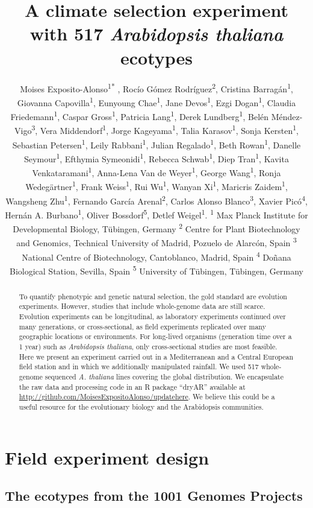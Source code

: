\documentclass[12pt,]{article}
\title{A climate selection experiment with 517 \emph{Arabidopsis thaliana}
ecotypes}
\author{\newline \normalfont Moises
Exposito-Alonso\textsuperscript{1}\textsuperscript{*} , Rocío Gómez
Rodríguez\textsuperscript{2}, Cristina Barragán\textsuperscript{1},
Giovanna Capovilla\textsuperscript{1}, Eunyoung Chae\textsuperscript{1},
Jane Devos\textsuperscript{1}, Ezgi Dogan\textsuperscript{1}, Claudia
Friedemann\textsuperscript{1}, Caspar Gross\textsuperscript{1}, Patricia
Lang\textsuperscript{1}, Derek Lundberg\textsuperscript{1}, Belén
Méndez-Vigo\textsuperscript{3}, Vera Middendorf\textsuperscript{1},
Jorge Kageyama\textsuperscript{1}, Talia Karasov\textsuperscript{1},
Sonja Kersten\textsuperscript{1}, Sebastian Petersen\textsuperscript{1},
Leily Rabbani\textsuperscript{1}, Julian Regalado\textsuperscript{1},
Beth Rowan\textsuperscript{1}, Danelle Seymour\textsuperscript{1},
Efthymia Symeonidi\textsuperscript{1}, Rebecca
Schwab\textsuperscript{1}, Diep Tran\textsuperscript{1}, Kavita
Venkataramani\textsuperscript{1}, Anna-Lena Van de
Weyer\textsuperscript{1}, George Wang\textsuperscript{1}, Ronja
Wedegärtner\textsuperscript{1}, Frank Weiss\textsuperscript{1}, Rui
Wu\textsuperscript{1}, Wanyan Xi\textsuperscript{1}, Maricris
Zaidem\textsuperscript{1}, Wangsheng Zhu\textsuperscript{1}, Fernando
García Arenal\textsuperscript{2}, Carlos Alonso
Blanco\textsuperscript{3}, Xavier Picó\textsuperscript{4}, Hernán A.
Burbano\textsuperscript{1}, Oliver Bossdorf\textsuperscript{5}, Detlef
Weigel\textsuperscript{1}. \newline \small \newline \textsuperscript{1}
Max Planck Institute for Developmental Biology, Tübingen, Germany
\newline \textsuperscript{2} Centre for Plant Biotechnology and
Genomics, Technical University of Madrid, Pozuelo de Alarcón, Spain
\newline \textsuperscript{3} National Centre of Biotechnology,
Cantoblanco, Madrid, Spain \newline \textsuperscript{4} Doñana
Biological Station, Sevilla, Spain \newline \textsuperscript{5}
University of Tübingen, Tübingen, Germany \newline 
\newline \newline \newline \newline \newline \newline}
\date{}
\begin{document}
\maketitle
\begin{abstract}
To quantify phenotypic and genetic natural selection, the gold standard
are evolution experiments. However, studies that include whole-genome
data are still scarce. Evolution experiments can be longitudinal, as
laboratory experiments continued over many generations, or
cross-sectional, as field experiments replicated over many geographic
locations or environments. For long-lived organisms (generation time
over a 1 year) such as \textit{Arabidopsis thaliana}, only
cross-sectional studies are most feasible. Here we present an experiment
carried out in a Mediterranean and a Central European field station and
in which we additionally manipulated rainfall. We used 517 whole-genome
sequenced \textit{A. thaliana} lines covering the global distribution.
We encapsulate the raw data and processing code in an R package
``dryAR'' available at
\url{http://github.com/MoisesExpositoAlonso/updatehere}. We believe this
could be a useful resource for the evolutionary biology and the
Arabidopsis communities.
\end{abstract}

\section{Field experiment design}\label{field-experiment-design}

\subsection{The ecotypes from the 1001 Genomes
Projects}\label{the-ecotypes-from-the-1001-genomes-projects}
\end{document}
